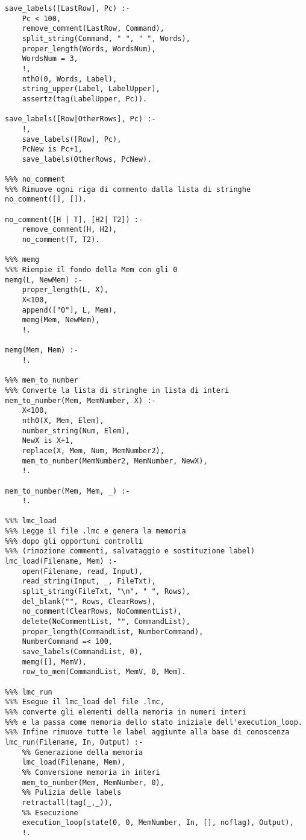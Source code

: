 \documentclass[a4paper,12pt, oneside]{book}
\begin{document}
\begin{verbatim}
save_labels([LastRow], Pc) :- 
    Pc < 100,
    remove_comment(LastRow, Command),
    split_string(Command, " ", " ", Words),
    proper_length(Words, WordsNum),
    WordsNum = 3,
    !,
    nth0(0, Words, Label),
    string_upper(Label, LabelUpper),
    assertz(tag(LabelUpper, Pc)).

save_labels([Row|OtherRows], Pc) :-
    !,
    save_labels([Row], Pc),
    PcNew is Pc+1,
    save_labels(OtherRows, PcNew).                                                                                            

%%% no_comment
%%% Rimuove ogni riga di commento dalla lista di stringhe 
no_comment([], []).

no_comment([H | T], [H2| T2]) :- 
    remove_comment(H, H2),
    no_comment(T, T2).

%%% memg
%%% Riempie il fondo della Mem con gli 0 
memg(L, NewMem) :- 
    proper_length(L, X),
    X<100,
    append(["0"], L, Mem),
    memg(Mem, NewMem), 
    !.

memg(Mem, Mem) :-
    !.

%%% mem_to_number
%%% Converte la lista di stringhe in lista di interi
mem_to_number(Mem, MemNumber, X) :- 
    X<100,
    nth0(X, Mem, Elem),
    number_string(Num, Elem),
    NewX is X+1,
    replace(X, Mem, Num, MemNumber2),
    mem_to_number(MemNumber2, MemNumber, NewX),
    !.

mem_to_number(Mem, Mem, _) :- 
    !.

%%% lmc_load
%%% Legge il file .lmc e genera la memoria
%%% dopo gli opportuni controlli 
%%% (rimozione commenti, salvataggio e sostituzione label)
lmc_load(Filename, Mem) :- 
    open(Filename, read, Input),
    read_string(Input, _, FileTxt),
    split_string(FileTxt, "\n", " ", Rows),
    del_blank("", Rows, ClearRows),
    no_comment(ClearRows, NoCommentList),
    delete(NoCommentList, "", CommandList),
    proper_length(CommandList, NumberCommand),
    NumberCommand =< 100,
    save_labels(CommandList, 0),
    memg([], MemV),
    row_to_mem(CommandList, MemV, 0, Mem).

%%% lmc_run
%%% Esegue il lmc_load del file .lmc,
%%% converte gli elementi della memoria in numeri interi
%%% e la passa come memoria dello stato iniziale dell'execution_loop.
%%% Infine rimuove tutte le label aggiunte alla base di conoscenza
lmc_run(Filename, In, Output) :- 
    %% Generazione della memoria
    lmc_load(Filename, Mem),
    %% Conversione memoria in interi
    mem_to_number(Mem, MemNumber, 0),
    %% Pulizia delle labels
    retractall(tag(_,_)), 
    %% Esecuzione
    execution_loop(state(0, 0, MemNumber, In, [], noflag), Output),
    !.
\end{verbatim}
\end{document}
